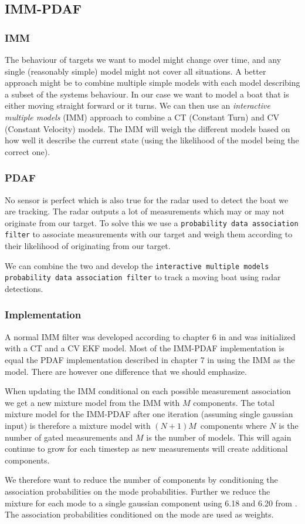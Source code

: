 \subsection{IMM-PDAF}
\subsubsection{IMM}
The behaviour of targets we want to model might change over time, and any single (reasonably simple) model might not cover all situations. A better approach might be to combine multiple simple models with each model describing a subset of the systems behaviour. In our case we want to model a boat that is either moving straight forward or it turns. We can then use an \textit{interactive multiple models} (IMM) approach to combine a CT (Constant Turn) and CV (Constant Velocity) models. The IMM will weigh the different models based on how well it describe the current state (using the likelihood of the model being the correct one).

\subsubsection{PDAF}
No sensor is perfect which is also true for the radar used to detect the boat we are tracking. The radar outputs a lot of measurements which may or may not originate from our target. To solve this we use a \texttt{probability data association filter} to associate measurements with our target and weigh them according to their likelihood of originating from our target.

We can combine the two and develop the \texttt{interactive multiple models probability data association filter} to track a moving boat using radar detections.

\subsubsection{Implementation}
A normal IMM filter was developed according to chapter 6 in \cite{edmund} and was initialized with a CT and a CV EKF model. Most of the IMM-PDAF implementation is equal the PDAF implementation described in chapter 7 in \cite{edmund} using the IMM as the model. There are however one difference that we should emphasize. 

When updating the IMM conditional on each possible measurement association we get a new mixture model from the IMM with $M$ components. The total mixture model for the IMM-PDAF after one iteration (assuming single gaussian input) is therefore a mixture model with $(N+1)M$ components where $N$ is the number of gated measurements and $M$ is the number of models. This will again continue to grow for each timestep as new measurements will create additional components.

We therefore want to reduce the number of components by conditioning the association probabilities on the mode probabilities. Further we reduce the mixture for each mode to a single gaussian component using 6.18 and 6.20 from \cite{edmund}. The association probabilities conditioned on the mode are used as weights. 



